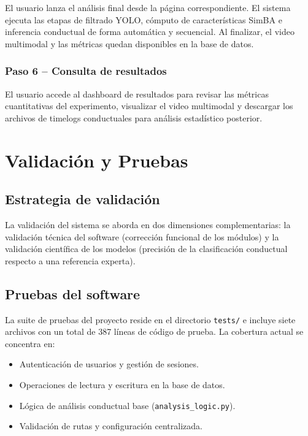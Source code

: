 \documentclass[12pt]{report}
\begin{document}
El usuario lanza el análisis final desde la página correspondiente. El sistema
ejecuta las etapas de filtrado YOLO, cómputo de características SimBA e
inferencia conductual de forma automática y secuencial. Al finalizar, el
video multimodal y las métricas quedan disponibles en la base de datos.

\subsection{Paso 6 -- Consulta de resultados}

El usuario accede al dashboard de resultados para revisar las métricas
cuantitativas del experimento, visualizar el video multimodal y descargar
los archivos de timelogs conductuales para análisis estadístico posterior.

\chapter{Validación y Pruebas}

\section{Estrategia de validación}

La validación del sistema se aborda en dos dimensiones complementarias: la
validación técnica del software (corrección funcional de los módulos) y la
validación científica de los modelos (precisión de la clasificación conductual
respecto a una referencia experta).

\section{Pruebas del software}

La suite de pruebas del proyecto reside en el directorio \texttt{tests/} e
incluye siete archivos con un total de 387 líneas de código de prueba. La
cobertura actual se concentra en:

\begin{itemize}[leftmargin=*]
    \item Autenticación de usuarios y gestión de sesiones.
    \item Operaciones de lectura y escritura en la base de datos.
    \item Lógica de análisis conductual base (\texttt{analysis\_logic.py}).
    \item Validación de rutas y configuración centralizada.
\end{itemize}
\end{document}
